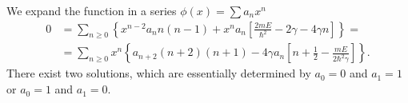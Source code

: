 \documentclass[english, parskip=full]{scrartcl}
\newcommand{\kla}{}
\newcommand{\klam}{}
\newcommand{\klammer}{}
\newcommand{\e}{\text{e}}
\begin{document}
We expand the function in a series $\phi(x) = \sum a_nx^n$
\begin{align}
0 &= \sum_{n\ge 0} \klammer\left\{ x^{n-2}a_n n(n-1) + x^n a_n \klam\left[ \frac{2mE}{\hbar^2} - 2\gamma - 4\gamma n \right] \right\} = \\
&= \sum_{n\ge 0} x^n \klammer\left\{ a_{n+2} (n+2)(n+1) - 4\gamma a_n \klam\left[ n + \frac{1}{2} - \frac{mE}{2\hbar^2\gamma} \right] \right\}.
\end{align}
There exist two solutions, which are essentially determined by $a_0=0$ and $a_1=1$ or $a_0=1$ and $a_1=0$.
\end{document}
